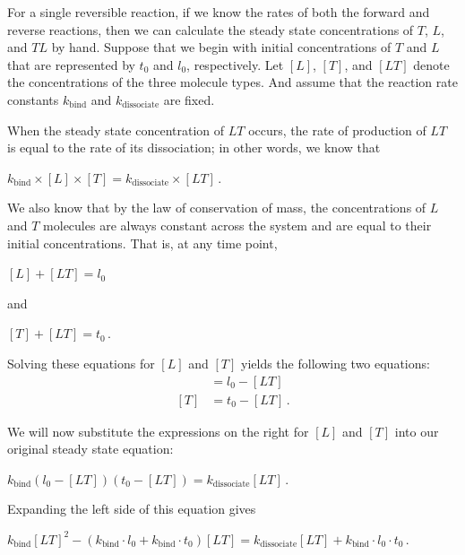 For a single reversible reaction, if we know the rates of both the forward and reverse reactions, then we can calculate the steady state concentrations of $T$, $L$, and $TL$ by hand.  Suppose that we begin with initial concentrations of $T$ and $L$ that are represented by $t_0$ and $l_0$, respectively. Let $[L]$, $[T]$, and $[LT]$ denote the concentrations of the three molecule types. And assume that the reaction rate constants $k_\text{bind}$ and $k_\text{dissociate}$ are fixed.

When the steady state concentration of $LT$ occurs, the rate of production of $LT$ is equal to the rate of its dissociation; in other words, we know that

\begin{center}
$k_\text{bind} \times [L] \times [T] = k_\text{dissociate} \times [LT] \,.$

\end{center}

We also know that by the law of conservation of mass, the concentrations of $L$ and $T$ molecules are always constant across the system and are equal to their initial concentrations. That is, at any time point,

\begin{center}
$[L] + [LT] = l_0$
\end{center}

\noindent and

\begin{center}
$[T] + [LT] = t_0 \,.$
\end{center}

\noindent Solving these equations for $[L]$ and $[T]$ yields the following two equations:
\begin{align*}
[L] & = l_0 - [LT]\\
[T] & = t_0 - [LT]\,.
\end{align*}

We will now substitute the expressions on the right for $[L]$ and $[T]$ into our original steady state equation:

\begin{center}
$k_\text{bind} (l_0 - [LT]) (t_0 - [LT]) = k_\text{dissociate} [LT]\,.$
\end{center}

\noindent Expanding the left side of this equation gives

\begin{center}
$k_\text{bind} [LT]^2 - (k_\text{bind} \cdot l_0 + k_\text{bind} \cdot t_0) [LT]  = k_\text{dissociate} [LT] + k_\text{bind} \cdot l_0 \cdot t_0\,.$
\end{center}

